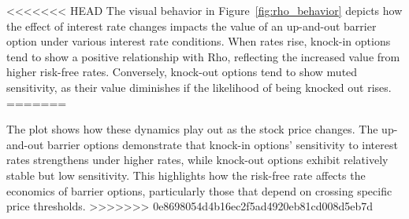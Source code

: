 <<<<<<< HEAD
The visual behavior in Figure~\ref{fig:rho_behavior} depicts how the effect of interest rate changes impacts the value of an up-and-out barrier option under various interest rate conditions. When rates rise, knock-in options tend to show a positive relationship with Rho, reflecting the increased value from higher risk-free rates. Conversely, knock-out options tend to show muted sensitivity, as their value diminishes if the likelihood of being knocked out rises.
=======


The plot shows how these dynamics play out as the stock price changes. The up-and-out barrier options demonstrate that knock-in options' sensitivity to interest rates strengthens under higher rates, while knock-out options exhibit relatively stable but low sensitivity. This highlights how the risk-free rate affects the economics of barrier options, particularly those that depend on crossing specific price thresholds.
>>>>>>> 0e8698054d4b16ec2f5ad4920eb81cd008d5eb7d
